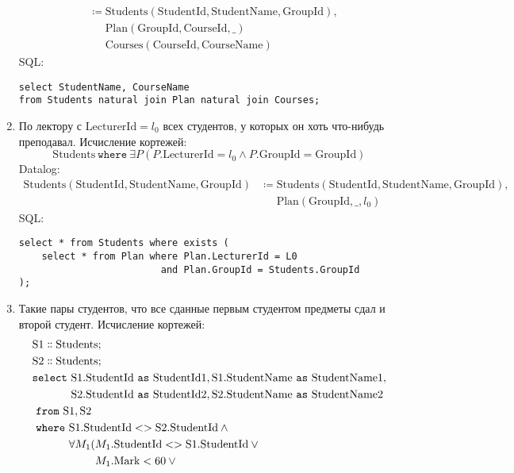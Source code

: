 \documentclass{article}
\newcommand{\Students}{\mathrm{Students}}
\newcommand{\Sq}{\mathrm{S1}}
\newcommand{\Sw}{\mathrm{S2}}
\newcommand{\StudentId}{\mathrm{StudentId}}
\newcommand{\StudentName}{\mathrm{StudentName}}
\newcommand{\GroupId}{\mathrm{GroupId}}
\newcommand{\Courses}{\mathrm{Courses}}
\newcommand{\CourseId}{\mathrm{CourseId}}
\newcommand{\CourseName}{\mathrm{CourseName}}
\newcommand{\Plan}{\mathrm{Plan}}
\newcommand{\LecturerId}{\mathrm{LecturerId}}
\newcommand{\Mark}{\mathrm{Mark}}
\newcommand{\select}{\mathtt{select}~}
\newcommand{\from}{~\mathtt{from}~}
\newcommand{\as}{~\mathtt{as}~}
\newcommand{\where}{~\mathtt{where}~}
\newcommand{\poloneq}{\mathrel{\phantom{\coloneq}}}
\begin{document}
\begin{enumerate}
\begin{align*}
        &\coloneq \Students(\StudentId, \StudentName, \GroupId), \\
        &\poloneq \Plan(\GroupId, \CourseId, \_) \\
        &\poloneq \Courses(\CourseId, \CourseName)
    \end{align*}
    SQL:
    \begin{verbatim}
select StudentName, CourseName
from Students natural join Plan natural join Courses;
    \end{verbatim}
    \item По лектору с $\LecturerId=l_0$ всех студентов,
        у которых он хоть что-нибудь преподавал.
    Исчисление кортежей:
    \[
        \Students \where \exists P (P.\LecturerId = l_0
        \land P.\GroupId = \GroupId)
    \]
    Datalog:
    \begin{align*}
        \Students(\StudentId, \StudentName, \GroupId)
        &\coloneq \Students(\StudentId, \StudentName, \GroupId), \\
        &\poloneq \Plan(\GroupId, \_, l_0)
    \end{align*}
    SQL:
    \begin{verbatim}
select * from Students where exists (
    select * from Plan where Plan.LecturerId = L0
                         and Plan.GroupId = Students.GroupId
);
    \end{verbatim}
    \item Такие пары студентов,
        что все сданные первым студентом предметы сдал и второй студент.
    Исчисление кортежей:
    \begin{align*}
        &\Sq \dblcolon \Students; \\
        &\Sw \dblcolon \Students; \\
        &\select \Sq.\StudentId \as \mathrm{StudentId1},
                 \Sq.\StudentName \as \mathrm{StudentName1}, \\
        &\phantom{\select} \Sw.\StudentId \as \mathrm{StudentId2},
                           \Sw.\StudentName \as \mathrm{StudentName2} \\
        &\from \Sq, \Sw \\
        &\where \Sq.\StudentId <> \Sw.\StudentId \land \phantom{q}\\
        &\phantom{\where} \forall M_1 (M_1.\StudentId <> \Sq.\StudentId \lor \phantom{q}\\
        &\phantom{\where \forall M_1 (} M_1.\Mark < 60 \lor \phantom{q}\\
        &\phantom{\where \forall M_1 (}

\end{align*}
\end{enumerate}
\end{document}
